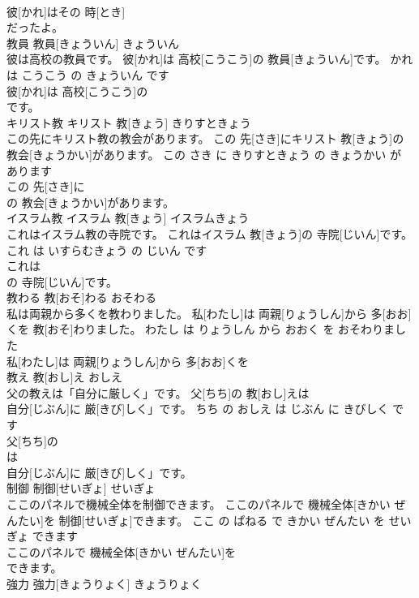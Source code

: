 \documentclass[8pt]{extreport}
\begin{document}
\begin{CJK}{UTF8}{min}
\\	彼[かれ]はその 時[とき]
\\	だったよ。			
\\	教員	教員[きょういん]	きょういん	
\\	彼は高校の教員です。	彼[かれ]は 高校[こうこう]の 教員[きょういん]です。	かれ は こうこう の きょういん です	
\\	彼[かれ]は 高校[こうこう]の
\\	です。			
\\	キリスト教	キリスト 教[きょう]	きりすときょう	
\\	この先にキリスト教の教会があります。	この 先[さき]にキリスト 教[きょう]の 教会[きょうかい]があります。	この さき に きりすときょう の きょうかい が あります	
\\	この 先[さき]に
\\	の 教会[きょうかい]があります。			
\\	イスラム教	イスラム 教[きょう]	イスラムきょう	
\\	これはイスラム教の寺院です。	これはイスラム 教[きょう]の 寺院[じいん]です。	これ は いすらむきょう の じいん です	
\\	これは
\\	の 寺院[じいん]です。			
\\	教わる	教[おそ]わる	おそわる	
\\	私は両親から多くを教わりました。	私[わたし]は 両親[りょうしん]から 多[おお]くを 教[おそ]わりました。	わたし は りょうしん から おおく を おそわりました	
\\	私[わたし]は 両親[りょうしん]から 多[おお]くを
\\	教え	教[おし]え	おしえ	
\\	父の教えは「自分に厳しく」です。	父[ちち]の 教[おし]えは
\\	自分[じぶん]に 厳[きび]しく」です。	ちち の おしえ は じぶん に きびしく です	
\\	父[ちち]の
\\	は
\\	自分[じぶん]に 厳[きび]しく」です。			
\\	制御	制御[せいぎょ]	せいぎょ	
\\	ここのパネルで機械全体を制御できます。	ここのパネルで 機械全体[きかい ぜんたい]を 制御[せいぎょ]できます。	ここ の ぱねる で きかい ぜんたい を せいぎょ できます	
\\	ここのパネルで 機械全体[きかい ぜんたい]を
\\	できます。			
\\	強力	強力[きょうりょく]	きょうりょく	

\end{CJK}
\end{document}
